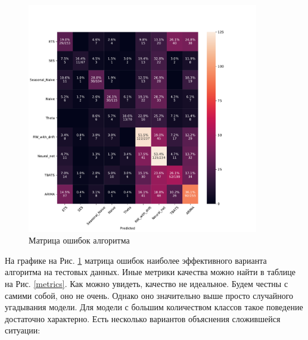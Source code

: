 \documentclass[a4paper,12pt]{article}
\begin{document}
	\begin{figure}[!h]
	
	\begin{center}
		\includegraphics[width=
		0.9\textwidth]{conf}%
		\caption{Матрица ошибок алгоритма}
		\label{conf}
	\end{center}
\end{figure} 

На графике на Рис. \ref{conf} матрица ошибок наиболее эффективного варианта алгоритма на тестовых данных. Иные метрики качества можно найти в таблице на Рис. \ref{metrics}. Как можно увидеть, качество не идеальное. Будем честны с самими собой, оно не очень. Однако оно значительно выше просто случайного угадывания модели. Для модели с большим количеством классов такое поведение достаточно характерно. Есть несколько вариантов объяснения сложившейся ситуации:
\end{document}
